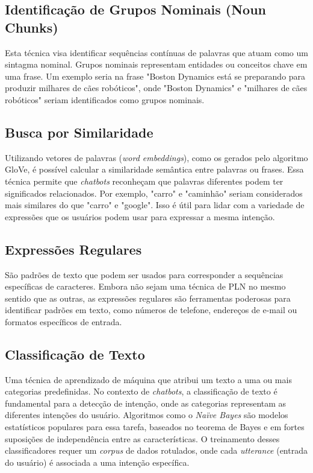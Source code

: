\documentclass[14pt,a4paper,oneside]{book}
\begin{document}
\subsection{Identificação de Grupos Nominais (Noun Chunks)}
Esta técnica visa identificar sequências contínuas de palavras que atuam como um sintagma nominal. Grupos nominais representam entidades ou conceitos chave em uma frase. Um exemplo seria na frase "Boston Dynamics está se preparando para produzir milhares de cães robóticos", onde "Boston Dynamics" e "milhares de cães robóticos" seriam identificados como grupos nominais.

\subsection{Busca por Similaridade}
Utilizando vetores de palavras (\textit{word embeddings}), como os gerados pelo algoritmo GloVe, é possível calcular a similaridade semântica entre palavras ou frases. Essa técnica permite que \textit{chatbots} reconheçam que palavras diferentes podem ter significados relacionados. Por exemplo, "carro" e "caminhão" seriam considerados mais similares do que "carro" e "google". Isso é útil para lidar com a variedade de expressões que os usuários podem usar para expressar a mesma intenção.

\subsection{Expressões Regulares}
São padrões de texto que podem ser usados para corresponder a sequências específicas de caracteres. Embora não sejam uma técnica de PLN no mesmo sentido que as outras, as expressões regulares são ferramentas poderosas para identificar padrões em texto, como números de telefone, endereços de e-mail ou formatos específicos de entrada.

\subsection{Classificação de Texto}
Uma técnica de aprendizado de máquina que atribui um texto a uma ou mais categorias predefinidas. No contexto de \textit{chatbots}, a classificação de texto é fundamental para a detecção de intenção, onde as categorias representam as diferentes intenções do usuário. Algoritmos como o \textit{Naïve Bayes} são modelos estatísticos populares para essa tarefa, baseados no teorema de Bayes e em fortes suposições de independência entre as características. O treinamento desses classificadores requer um \textit{corpus} de dados rotulados, onde cada \textit{utterance} (entrada do usuário) é associada a uma intenção específica.
\end{document}
